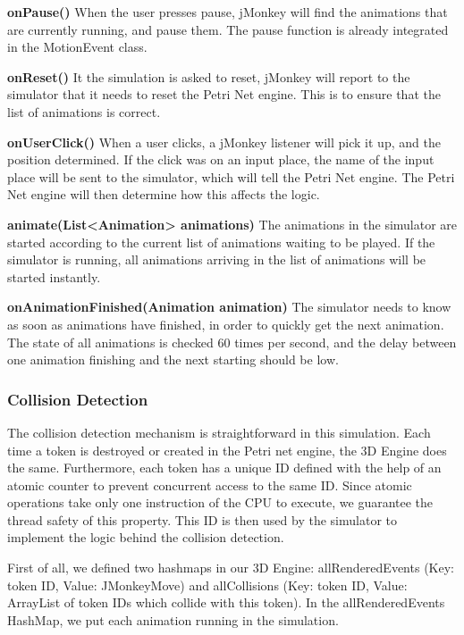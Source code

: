 \textbf{onPause()}
When the user presses pause, jMonkey will find the animations that are currently running, and pause them. The pause function is already integrated in the MotionEvent class.

\textbf{onReset()}
It the simulation is asked to reset, jMonkey will report to the simulator that it needs to reset the Petri Net engine. This is to ensure that the list of animations is correct.

\textbf{onUserClick()}
When a user clicks, a jMonkey listener will pick it up, and the position determined. If the click was on an input place, the name of the input place will be sent to the simulator, which will tell the Petri Net engine. The Petri Net engine will then determine how this affects the logic.

\textbf{animate(List<Animation> animations)}
The animations in the simulator are started according to the current list of animations waiting to be played. If the simulator is running, all animations arriving in the list of animations will be started instantly.

\textbf{onAnimationFinished(Animation animation)}
The simulator needs to know as soon as animations have finished, in order to quickly get the next animation. The state of all animations is checked 60 times per second, and the delay between one animation finishing and the next starting should be low.

\subsubsection{Collision Detection}

The collision detection mechanism is straightforward in this simulation. Each time a token is destroyed or created in the Petri net engine, the 3D Engine does the same. Furthermore, each token has a unique ID defined with the help of an atomic counter to prevent concurrent access to the same ID. Since atomic operations take only one instruction of the CPU to execute, we guarantee the thread safety of this property.
This ID is then used by the simulator to implement the logic behind the collision detection.

First of all, we defined two hashmaps in our 3D Engine: allRenderedEvents (Key: token ID, Value: JMonkeyMove) and allCollisions (Key: token ID, Value: ArrayList of token IDs which collide with this token).
In the allRenderedEvents HashMap, we put each animation running in the simulation. 

